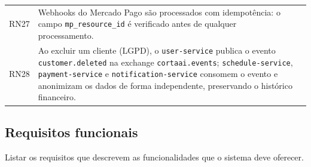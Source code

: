 \documentclass[
    12pt, 
    a4paper, 
    oneside, 
    chapter=TITLE, 
    section=TITLE
]{abntex2}
\begin{document}
\begin{longtable}{p{1.5cm} p{10.5cm} p{2cm}}
    RN27 & Webhooks do Mercado Pago são processados com idempotência: o campo \texttt{mp\_resource\_id} é verificado antes de qualquer processamento. & \\
    RN28 & Ao excluir um cliente (LGPD), o \texttt{user-service} publica o evento \texttt{customer.deleted} na exchange \texttt{cortaai.events}; \texttt{schedule-service}, \texttt{payment-service} e \texttt{notification-service} consomem o evento e anonimizam os dados de forma independente, preservando o histórico financeiro. & \\
\end{longtable}

\subsection{Requisitos funcionais}
Listar os requisitos que descrevem as funcionalidades que o sistema deve oferecer.
\end{document}
